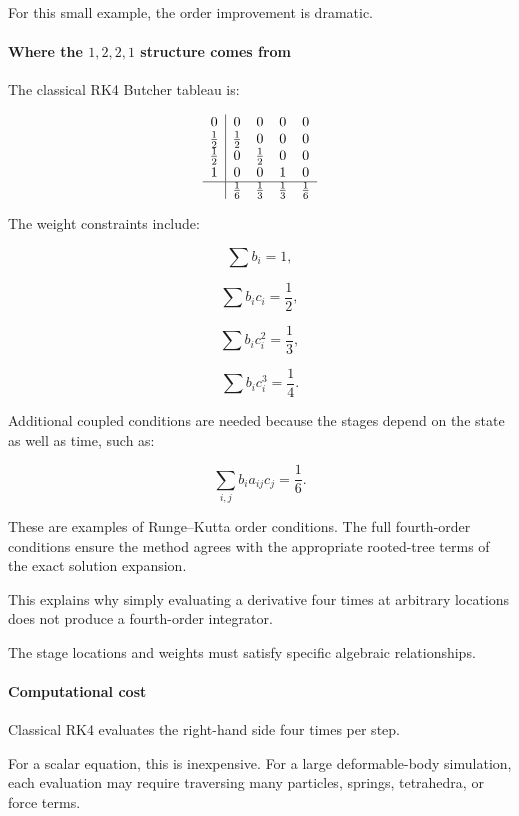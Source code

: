 For this small example, the order improvement is dramatic.

\paragraph{\texorpdfstring{Where the \(1,2,2,1\) structure comes from}{Where the 1,2,2,1 structure comes from}}\label{02-foundations-ii-ch025-where-the-1221-structure-comes-from}

The classical RK4 Butcher tableau is:

\[
\begin{array}{c|cccc} 0&0&0&0&0\\ \frac12&\frac12&0&0&0\\ \frac12&0&\frac12&0&0\\ 1&0&0&1&0\\ \hline &\frac16&\frac13&\frac13&\frac16 \end{array}
\]

The weight constraints include:

\[
\sum b_i=1,
\]

\[
\sum b_ic_i=\frac12,
\]

\[
\sum b_ic_i^2=\frac13,
\]

\[
\sum b_ic_i^3=\frac14.
\]

Additional coupled conditions are needed because the stages depend on the state as well as time, such as:

\[
\sum_{i,j}b_i a_{ij}c_j=\frac16.
\]

These are examples of Runge--Kutta order conditions. The full fourth-order conditions ensure the method agrees with the appropriate rooted-tree terms of the exact solution expansion.

This explains why simply evaluating a derivative four times at arbitrary locations does not produce a fourth-order integrator.

The stage locations and weights must satisfy specific algebraic relationships.

\paragraph{Computational cost}\label{02-foundations-ii-ch025-computational-cost}

Classical RK4 evaluates the right-hand side four times per step.

For a scalar equation, this is inexpensive. For a large deformable-body simulation, each evaluation may require traversing many particles, springs, tetrahedra, or force terms.

